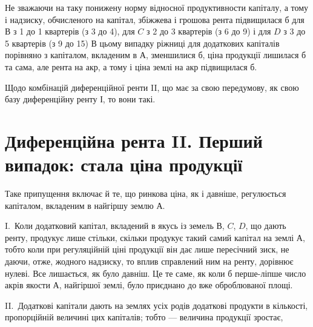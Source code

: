 \noindent{}Не зважаючи на таку понижену норму відносної продуктивности капіталу,
а тому і надзиску, обчисленого на капітал, збіжжева і грошова рента підвищилася
б для $В$ з 1 до 1 квартерів (з 3 до 4), для $C$ з 2 до 3 квартерів (з 6 до 9) і для $D$ з 3 до 5 квартерів (з 9 до 15)
В цьому випадку ріжниці для додаткових капіталів порівняно з капіталом,
вкладеним в $А$, зменшилися б, ціна продукції лишилася б та сама, але рента
на акр, а тому і ціна землі на акр підвищилася б.

Щодо комбінацій диференційної ренти II, що має за свою передумову, як
свою базу диференційну ренту І, то вони такі.

\section{Диференційна рента II. \textendash{} Перший випадок: стала ціна продукції}

Таке припущення включає й те, що ринкова ціна, як і давніше, регулюється
капіталом, вкладеним в найгіршу землю $А$.

I.~Коли додатковий капітал, вкладений в якусь із земель $В$, $C$, $D$, що
дають ренту, продукує лише стільки, скільки продукує такий самий капітал на
землі $А$, тобто коли при регуляційній ціні продукції він дає лише пересічний
зиск, не даючи, отже, жодного надзиску, то вплив справлений ним на ренту, дорівнює
нулеві. Все лишається, як було давніш. Це те саме, як коли б перше-ліпше
число акрів якости $А$, найгіршої землі, було приєднано до вже оброблюваної
площі.

II.~Додаткові капітали дають на землях усіх родів додаткові продукти в кількості,
пропорційній величині цих капіталів; тобто — величина продукції зростає,
\parbreak{}  %
